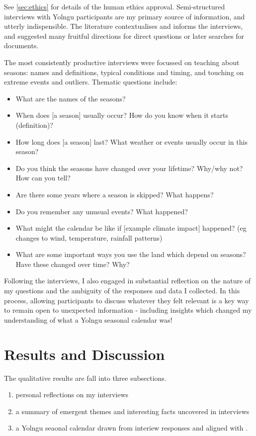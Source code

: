 See \autoref{sec:ethics} for details of the human ethics approval.
Semi-structured interviews with Yolngu participants are my primary source
of information, and utterly indispensible.
The literature contextualises and informs the interviews, and suggested many fruitful
directions for direct questions or later searches for documents.

The most consistently productive interviews were focussed on teaching about
seasons: names and definitions, typical conditions and timing, and touching on
extreme events and outliers. Thematic questions include:
\begin{itemize}
\item What are the names of the seasons?
\item When does [a season] usually occur?  How do you know when it starts (definition)?
\item How long does [a season] last?  What weather or events usually occur in this season?
\item Do you think the seasons have changed over your lifetime?  Why/why not?  How can you tell?
\item Are there some years where a season is skipped?  What happens?
\item Do you remember any unusual events?  What happened?
\item What might the calendar be like if [example climate impact] happened? 
      (eg changes to wind, temperature, rainfall patterns) 
\item What are some important ways you use the land which depend on seasons?  Have these changed over time?  Why?
\end{itemize}

Following the interviews, I also engaged in substantial reflection on the nature
of my questions and the ambiguity of the responses and data I collected.
In this process, allowing participants to discuss whatever they felt relevant
is a key way to remain open to unexpected information - including insights
which changed my understanding of what a Yolngu seasonal calendar was!



\section{Results and Discussion}

The qualitative results are fall into three subsections.
\begin{enumerate}
\item personal reflections on my interviews
\item a summary of emergent themes and interesting facts uncovered in interviews
\item a Yolngu seaonal calendar drawn from interiew responses and aligned with \citet{davis1989}.
\end{enumerate}


